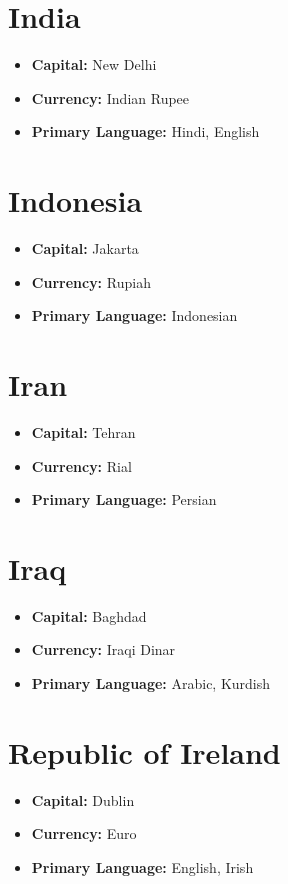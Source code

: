 \documentclass[a4paper,100pt,twoside]{book}
\begin{document}
\section*{\Huge India}
\vspace{5mm} %
\begin{itemize}
	\item \textbf{Capital:} New Delhi
	\item \textbf{Currency:} Indian Rupee
	\item \textbf{Primary Language:} Hindi, English
\end{itemize}

\section*{\Huge Indonesia}
\vspace{5mm} %
\begin{itemize}
	\item \textbf{Capital:} Jakarta
	\item \textbf{Currency:} Rupiah
	\item \textbf{Primary Language:} Indonesian
\end{itemize}

\section*{\Huge Iran}
\vspace{5mm} %
\begin{itemize}
	\item \textbf{Capital:} Tehran
	\item \textbf{Currency:} Rial
	\item \textbf{Primary Language:} Persian
\end{itemize}

\section*{\Huge Iraq}
\vspace{5mm} %
\begin{itemize}
	\item \textbf{Capital:} Baghdad
	\item \textbf{Currency:} Iraqi Dinar
	\item \textbf{Primary Language:} Arabic, Kurdish
\end{itemize}

\section*{\Huge Republic of Ireland}
\vspace{5mm} %
\begin{itemize}
	\item \textbf{Capital:} Dublin
	\item \textbf{Currency:} Euro
	\item \textbf{Primary Language:} English, Irish
\end{itemize}
\end{document}

